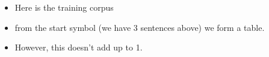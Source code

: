 \documentclass[11pt]{article}
\begin{document}
\begin{minipage}[l]{.5\linewidth}
    \begin{figure}[H]
        \centering
    \end{figure}    
\end{minipage}\hfill
\begin{minipage}[r]{.48\linewidth}
    \begin{itemize}
        \item Here is the training corpus
    \end{itemize}
\end{minipage}

\begin{minipage}[l]{.5\linewidth}
    \begin{figure}[H]
        \centering
    \end{figure}    
\end{minipage}\hfill
\begin{minipage}[r]{.48\linewidth}
    \begin{itemize}
        \item from the start symbol (we have 3 sentences above) we form a table.
        \item However, this doesn't add up to 1.
    \end{itemize}
\end{minipage}
\end{document}
